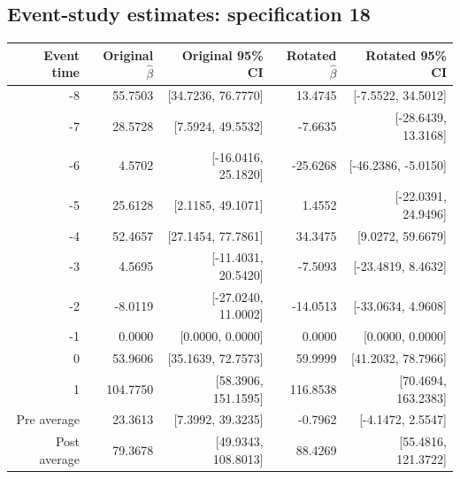 \documentclass[10pt]{article}
\begin{document}
\subsection*{Event-study estimates: specification 18}
\begin{center}\scriptsize
\begin{tabular}{r rr rr}
\toprule
Event time & Original $\hat\beta$ & Original 95\% CI & Rotated $\hat\beta$ & Rotated 95\% CI \\
\midrule
-8 & 55.7503 & [34.7236, 76.7770] & 13.4745 & [-7.5522, 34.5012] \\
-7 & 28.5728 & [7.5924, 49.5532] & -7.6635 & [-28.6439, 13.3168] \\
-6 & 4.5702 & [-16.0416, 25.1820] & -25.6268 & [-46.2386, -5.0150] \\
-5 & 25.6128 & [2.1185, 49.1071] & 1.4552 & [-22.0391, 24.9496] \\
-4 & 52.4657 & [27.1454, 77.7861] & 34.3475 & [9.0272, 59.6679] \\
-3 & 4.5695 & [-11.4031, 20.5420] & -7.5093 & [-23.4819, 8.4632] \\
-2 & -8.0119 & [-27.0240, 11.0002] & -14.0513 & [-33.0634, 4.9608] \\
-1 & 0.0000 & [0.0000, 0.0000] & 0.0000 & [0.0000, 0.0000] \\
0 & 53.9606 & [35.1639, 72.7573] & 59.9999 & [41.2032, 78.7966] \\
1 & 104.7750 & [58.3906, 151.1595] & 116.8538 & [70.4694, 163.2383] \\
\midrule
Pre average & 23.3613 & [7.3992, 39.3235] & -0.7962 & [-4.1472, 2.5547] \\
Post average & 79.3678 & [49.9343, 108.8013] & 88.4269 & [55.4816, 121.3722] \\
\bottomrule
\end{tabular}
\end{center}
\clearpage
\end{document}

